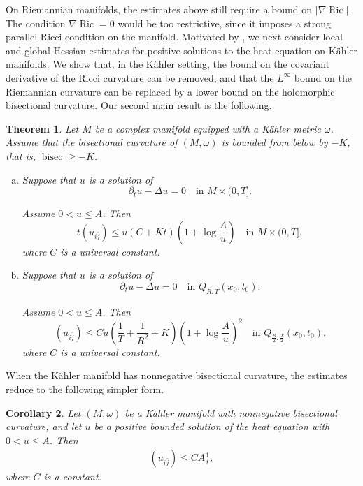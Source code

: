 \documentclass{amsart}
\newtheorem{theorem}{Theorem}[section]
\newtheorem{corollary}[theorem]{Corollary}
\theoremstyle{definition}
\theoremstyle{remark}
\numberwithin{equation}{section}
\begin{document}
On Riemannian manifolds, the estimates above still require a bound on $|\nabla \operatorname{Ric}|$. The condition $\nabla \operatorname{Ric}=0$ would be too restrictive, since it imposes a strong parallel Ricci condition on the manifold. Motivated by \cite{Cao-Ni}, we next consider local and global Hessian estimates for positive solutions to the heat equation on K\"ahler manifolds. We show that, in the K\"ahler setting, the bound on the covariant derivative of the Ricci curvature can be removed, and that the $L^{\infty}$ bound on the Riemannian curvature can be replaced by a lower bound on the holomorphic bisectional curvature. Our second main result is the following.
\begin{theorem}\label{Kahler}
    Let $M$ be a complex manifold equipped with a K\"ahler metric $\omega$. Assume that the bisectional curvature of $(M,\omega)$ is bounded from below by $-K$, that is, $\operatorname{bisec} \geq -K$.
    \begin{enumerate}[(a)]
        \item Suppose that $u$ is a solution of
    \[
    \partial_t u-\Delta u=0 \quad \text{in } M \times(0, T] .
    \]
    
    Assume $0<u \leq A$. Then
    \[
    t\left(u_{i \bar{j}}\right) \leq u(C+K t)\left(1+\log \frac{A}{u}\right) \quad \text{in } M \times(0, T],
    \]
    where $C$ is a universal constant.
    \item Suppose that $u$ is a solution of
    \[
    \partial_t u-\Delta u=0 \quad \text{in } Q_{R, T}\left(x_0, t_0\right) .
    \]
    
    Assume $0<u \leq A$. Then
    \[
    \left(u_{i \bar{j}}\right) \leq C u\left(\frac{1}{T}+\frac{1}{R^2}+K\right)\left(1+\log \frac{A}{u}\right)^2 \quad \text{in } Q_{\frac{R}{2}, \frac{T}{2}}\left(x_0, t_0\right) .
    \]
    where $C$ is a universal constant.
    \end{enumerate}
\end{theorem}

When the K\"ahler manifold has nonnegative bisectional curvature, the estimates reduce to the following simpler form.

\begin{corollary}
    Let $(M,\omega)$ be a K\"ahler manifold with nonnegative bisectional curvature, and let $u$ be a positive bounded solution of the heat equation with $0<u\leq A$. Then
\begin{align*}
\left(u_{i \bar{j}}\right)\leq CA\frac{1}{t},
\end{align*}
where $C$ is a constant.
\end{corollary}
\end{document}
